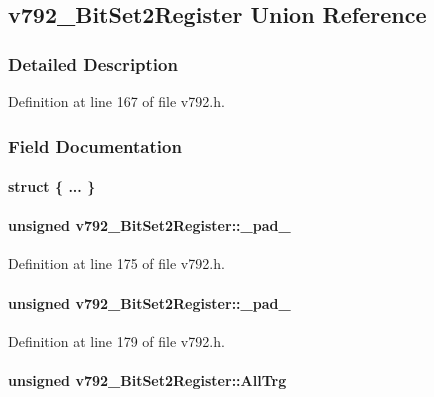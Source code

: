 \subsection{v792\_\-BitSet2Register Union Reference}
\label{unionv792__BitSet2Register}


\subsubsection{Detailed Description}


Definition at line 167 of file v792.h.

\subsubsection{Field Documentation}
\paragraph[{"@8}]{\setlength{\rightskip}{0pt plus 5cm}struct \{ ... \} }\hfill\label{unionv792__BitSet2Register_a24ba0669f538250854660bdf6e52100a}
\paragraph[{\_\-pad\_\-1}]{\setlength{\rightskip}{0pt plus 5cm}unsigned {\bf v792\_\-BitSet2Register::\_\-pad\_}}\hfill\label{unionv792__BitSet2Register_a617daff4912134ad39bec2c8536a96ac}


Definition at line 175 of file v792.h.
\paragraph[{\_\-pad\_\-2}]{\setlength{\rightskip}{0pt plus 5cm}unsigned {\bf v792\_\-BitSet2Register::\_\-pad\_}}\hfill\label{unionv792__BitSet2Register_a879314bb775d64561df42eb2174326c8}


Definition at line 179 of file v792.h.
\paragraph[{AllTrg}]{\setlength{\rightskip}{0pt plus 5cm}unsigned {\bf v792\_\-BitSet2Register::AllTrg}}\hfill\label{unionv792__BitSet2Register_a998ecb30dbe08396b4e3dae5eac9193c}


